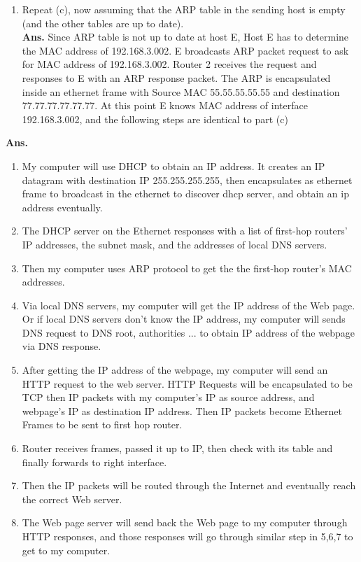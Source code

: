 \documentclass[11pt]{article}
\newenvironment{problem}[2][Problem]{\begin{trivlist}
\item[\hskip \labelsep {\bfseries #1}\hskip \labelsep {\bfseries #2.}]}{\end{trivlist}}
\begin{document}
\begin{enumerate}
\begin{enumerate}
	\end{enumerate}
	
	\item[d. ]
	Repeat (c), now assuming that the ARP table in the sending host is empty (and the
	other tables are up to date).
	\\
	\textbf{Ans. } 
	Since ARP table is not up to date at host E, 
	Host E has to determine the MAC address of 192.168.3.002. 
	E broadcasts ARP packet request to ask for MAC address of 192.168.3.002. 
	Router 2 receives the request and responses to E with an ARP response packet. 
	The ARP is encapsulated inside an ethernet frame with Source MAC 55.55.55.55.55 and destination 77.77.77.77.77.77. 
	At this point E knows MAC address of interface 192.168.3.002, 
	and the following steps are identical to part (c) 
\end{enumerate}


\begin{problem}{2}
\end{problem}
\textbf{Ans. }
\begin{enumerate}
	\item 
	My computer will use DHCP to obtain an IP address. It creates an IP datagram with destination IP 255.255.255.255, then encapsulates as ethernet frame to broadcast in the ethernet to discover dhcp server, and obtain an ip address eventually. 
	\item 
	The DHCP server on the Ethernet responses with a list of first-hop routers’ IP addresses,
	the subnet mask, and the addresses of local DNS servers.

	\item 
	Then my computer uses ARP protocol to get the the first-hop router’s MAC addresses.

	\item 
	Via local DNS servers, my computer will get the IP address of the Web page. Or if local DNS servers don't know the IP address, my computer will sends DNS request to DNS root, authorities ... to obtain IP address of the webpage via DNS response.

	\item 
	After getting the IP address of the webpage, my computer will send an HTTP request to the web server. 
	HTTP Requests will be encapsulated to be TCP then IP packets with my computer's IP as source address, and webpage's IP as destination IP address.
	Then IP packets become Ethernet Frames to be sent to first hop router. 

	\item 
	Router receives frames, passed it up to IP, then check with its table and finally forwards to right interface.

	\item 
	Then the IP packets will be routed through the Internet and eventually reach the correct Web server.

	\item 
	The Web page server will send back the Web page to my computer through HTTP responses, and those responses will go through similar step in 5,6,7 to get to my computer.
	
\end{enumerate}
\end{document}
